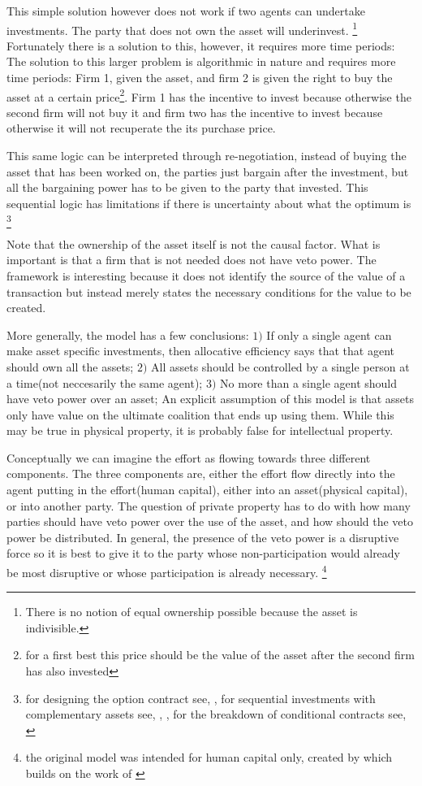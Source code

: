 \documentclass[12pt]{article}
\numberwithin{equation}{section}
\begin{document}
This simple solution however does not work if two agents can undertake investments. The party that does not own the asset will underinvest. \footnote{There is no notion of equal ownership possible because the asset is indivisible.} Fortunately there is a solution to this, however, it requires more time periods: The solution to this larger problem is algorithmic in nature and requires more time periods: Firm 1, given the asset, and firm 2 is given the right to buy the asset at a certain price\footnote{for a first best this price should be the value of the asset after the second firm has also invested}. Firm 1 has the incentive to invest because otherwise the second firm will not buy it and firm two has the incentive to invest because otherwise it will not recuperate the its purchase price. 

This same logic can be interpreted through re-negotiation, instead of buying the asset that has been worked on, the parties just bargain after the investment, but all the bargaining power has to be given to the party that invested. This sequential logic has limitations if there is uncertainty about what the optimum is \footnote{for designing the option contract see, \cite{Noldeke1998}, for sequential investments with complementary assets see, \cite{Zhang2014},\cite{bessen_maskin} , for the breakdown of conditional contracts see, \cite{Maskin1999}} 

Note that the ownership of the asset itself is not the causal factor. What is important is that a firm that is not needed does not have veto power. The framework is interesting because it does not identify the source of the value of a transaction but instead merely states the necessary conditions for the value to be created. 

More generally, the model has a few conclusions: $1)$ If only a single agent can make asset specific investments, then allocative efficiency says that that agent should own all the assets; $2)$ All assets should be controlled by a single person at a time(not neccesarily the same agent); $3)$ No more than a single agent should have veto power over an asset; An explicit assumption of this model is that assets only have value on the ultimate coalition that ends up using them. While this may be true in physical property, it is probably false for intellectual property. 

Conceptually we can imagine the effort as flowing towards three different components. The three components are, either the effort flow directly into the agent putting in the effort(human capital), either into an asset(physical capital), or into another party. The question of private property has to do with how many parties should have veto power over the use of the asset, and how should the veto power be distributed. In general, the presence of the veto power is a disruptive force so it is best to give it to the party whose non-participation would already be most disruptive or whose participation is already necessary. \footnote{the original model was intended for human capital only, created by \cite{Hart1990} which builds on the work of \cite{Grossman1986} }
\end{document}
